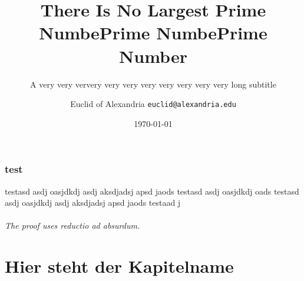 \documentclass[aspectratio=169]{beamer}
\title{There Is No Largest Prime NumbePrime NumbePrime Number}
\subtitle{A very very ververy very very very very very very very long subtitle}
\date{\today}
\author[Euclid]{Euclid of Alexandria \texttt{euclid@alexandria.edu}}
\begin{document}
	

\begin{frame}
\titlepage
\end{frame}

\section{test}

\begin{frame}{testasd asdj oasjdkdj asdj aksdjadsj apsd jaods testasd asdj oasjdkdj oads testasd asdj oasjdkdj asdj aksdjadsj apsd jaods testaad j}
	
	\framesubtitle{The proof uses \textit{reductio ad absurdum}.} 
	\blindtext
\end{frame}

\part{Hier steht der Kapitelname}
\end{document}
